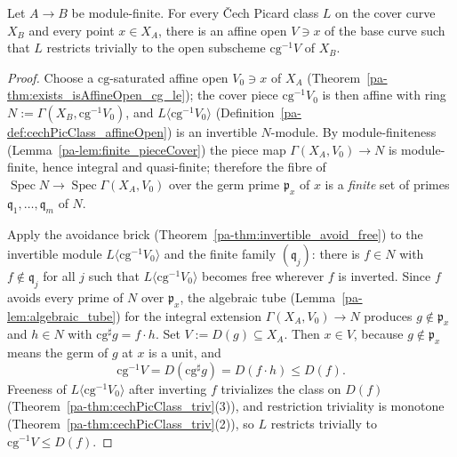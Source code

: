 \begin{theorem}
  \label{pa-thm:moving_lemma}
  \leanok

  Let \(A \to B\) be module-finite. For every \v Cech Picard class \(L\) on the cover curve \(X_B\)
  and every point \(x \in X_A\), there is an affine open \(V \ni x\) of the base curve such that \(L\)
  restricts trivially to the open subscheme \(\mathrm{cg}^{-1}V\) of \(X_B\).
\end{theorem}
\begin{proof}
  \leanok
  Choose a \(\mathrm{cg}\)-saturated affine open \(V_0 \ni x\) of \(X_A\)
  (Theorem~\ref{pa-thm:exists_isAffineOpen_cg_le}); the cover piece \(\mathrm{cg}^{-1}V_0\) is then
  affine with ring \(N := \Gamma(X_B, \mathrm{cg}^{-1}V_0)\), and \(L\langle \mathrm{cg}^{-1}V_0
  \rangle\) (Definition~\ref{pa-def:cechPicClass_affineOpen}) is an invertible \(N\)-module. By
  module-finiteness (Lemma~\ref{pa-lem:finite_pieceCover}) the piece map \(\Gamma(X_A, V_0) \to N\) is
  module-finite, hence integral and quasi-finite; therefore the fibre of \(\operatorname{Spec} N \to
  \operatorname{Spec}\Gamma(X_A, V_0)\) over the germ prime \(\mathfrak p_x\) of \(x\) is a
  \emph{finite} set of primes \(\mathfrak q_1, \dots, \mathfrak q_m\) of \(N\).

  Apply the avoidance brick (Theorem~\ref{pa-thm:invertible_avoid_free}) to the invertible module
  \(L\langle \mathrm{cg}^{-1}V_0\rangle\) and the finite family \((\mathfrak q_j)\): there is \(f \in
  N\) with \(f \notin \mathfrak q_j\) for all \(j\) such that \(L\langle \mathrm{cg}^{-1}V_0\rangle\)
  becomes free wherever \(f\) is inverted. Since \(f\) avoids every prime of \(N\) over \(\mathfrak
  p_x\), the algebraic tube (Lemma~\ref{pa-lem:algebraic_tube}) for the integral extension \(\Gamma(X_A,
  V_0) \to N\) produces \(g \notin \mathfrak p_x\) and \(h \in N\) with \(\mathrm{cg}^{\sharp}g = f
  \cdot h\). Set \(V := D(g) \subseteq X_A\). Then \(x \in V\), because \(g \notin \mathfrak p_x\)
  means the germ of \(g\) at \(x\) is a unit, and
  \[
    \mathrm{cg}^{-1}V = D(\mathrm{cg}^{\sharp}g) = D(f \cdot h) \le D(f) .
  \]
  Freeness of \(L\langle \mathrm{cg}^{-1}V_0\rangle\) after inverting \(f\) trivializes the class on
  \(D(f)\) (Theorem~\ref{pa-thm:cechPicClass_triv}(3)), and restriction triviality is monotone
  (Theorem~\ref{pa-thm:cechPicClass_triv}(2)), so \(L\) restricts trivially to \(\mathrm{cg}^{-1}V \le
  D(f)\).


\end{proof}
